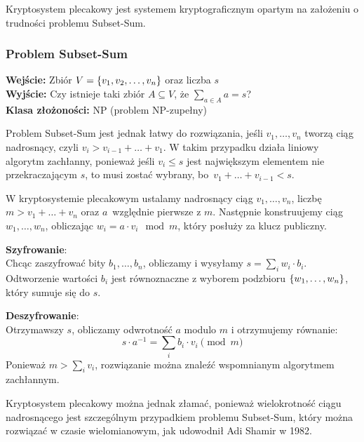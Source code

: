 Kryptosystem plecakowy jest systemem kryptograficznym opartym na założeniu o trudności problemu Subset-Sum.

\subsubsection*{Problem Subset-Sum}
\textbf{Wejście:} Zbiór \( V = \set{v_1, v_2, \dots, v_n} \) oraz liczba \( s \) \\
\textbf{Wyjście:} Czy istnieje taki zbiór \( A \subseteq V \), że \( \sum_{a \in A} a = s \)? \\
\textbf{Klasa złożoności:} NP (problem NP-zupełny)

Problem Subset-Sum jest jednak łatwy do rozwiązania, jeśli \( v_1, \dots, v_n \) tworzą ciąg nadrosnący, czyli \( v_i > v_{i-1} + \ldots + v_1 \).
W takim przypadku działa liniowy algorytm zachłanny, ponieważ jeśli \( v_i \leq s \) jest największym elementem nie przekraczającym \( s \), to musi zostać wybrany, bo~\( v_1 + \ldots + v_{i-1} < s \).

W kryptosystemie plecakowym ustalamy nadrosnący ciąg \( v_1, \dots, v_n \), liczbę \( m > v_1 + \ldots + v_n \) oraz \( a \)~względnie pierwsze z \( m \).
Następnie konstruujemy ciąg \( w_1, \dots, w_n \), obliczając \linebreak \( w_i = a \cdot v_i \mod m \), który posłuży za klucz publiczny.

\textbf{Szyfrowanie}: \\
Chcąc zaszyfrować bity \( b_1, \dots, b_n \), obliczamy i wysyłamy \( s = \sum_i w_i \cdot b_i \). Odtworzenie wartości \( b_i \) jest równoznaczne z wyborem podzbioru \( \set{w_1, \ldots, w_n} \), który sumuje się do \( s \).

\textbf{Deszyfrowanie}: \\
Otrzymawszy \( s \), obliczamy odwrotność \( a \) modulo \( m \) i otrzymujemy równanie:
\[
    s \cdot a^{-1} = \sum_i b_i \cdot v_i \pmod{m}
\]
Ponieważ \( m > \sum_i v_i \), rozwiązanie można znaleźć wspomnianym algorytmem zachłannym.

Kryptosystem plecakowy można jednak złamać, ponieważ wielokrotność ciągu nadrosnącego jest szczególnym przypadkiem problemu Subset-Sum, który można rozwiązać w czasie wielomianowym, jak udowodnił Adi Shamir w 1982.